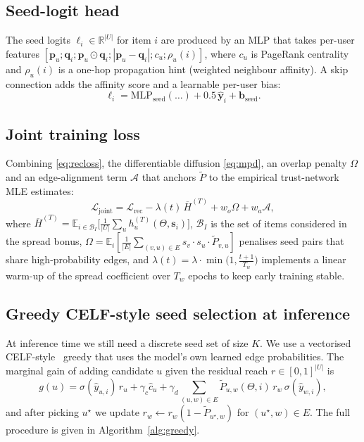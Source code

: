 \documentclass[conference]{IEEEtran}
\begin{document}
\subsection{Seed-logit head}
The seed logits $\boldsymbol{\ell}_i\in\mathbb{R}^{|U|}$ for item $i$
are produced by an MLP that takes per-user features
$[\mathbf{p}_u;\mathbf{q}_i;\mathbf{p}_u\!\odot\!\mathbf{q}_i;
|\mathbf{p}_u-\mathbf{q}_i|;c_u;\rho_u(i)]$, where $c_u$ is PageRank
centrality and $\rho_u(i)$ is a one-hop propagation hint
(weighted neighbour affinity). A skip connection adds the affinity
score and a learnable per-user bias:
\begin{equation}
\boldsymbol{\ell}_i = \mathrm{MLP}_{\text{seed}}(\dots) + 0.5\,\hat{\mathbf{y}}_i + \mathbf{b}_{\text{seed}}.
\label{eq:seedlogits}
\end{equation}

\subsection{Joint training loss}
Combining \eqref{eq:recloss}, the differentiable diffusion
\eqref{eq:mpd}, an overlap penalty $\Omega$ and an edge-alignment
term $\mathcal{A}$ that anchors $\widetilde P$ to the empirical
trust-network MLE estimates:
\begin{equation}
\mathcal{L}_{\text{joint}}
=\mathcal{L}_{\text{rec}}-\lambda(t)\,\overline{H}^{(T)}+w_{o}\Omega+w_{a}\mathcal{A},
\label{eq:totalloss}
\end{equation}
where $\overline{H}^{(T)}=\mathbb{E}_{i\in\mathcal{B}_I}\bigl[\frac{1}{|U|}\sum_u h_u^{(T)}(\Theta,\mathbf{s}_i)\bigr]$,
$\mathcal{B}_I$ is the set of items considered in the spread bonus,
$\Omega=\mathbb{E}_i[\frac{1}{|E|}\sum_{(v,u)\in E}s_v\!\cdot\!s_u\!\cdot\!\widetilde P_{v,u}]$ penalises seed pairs that share
high-probability edges, and $\lambda(t)=\lambda\cdot\min\!\bigl(1,\frac{t+1}{T_w}\bigr)$
implements a linear warm-up of the spread coefficient over $T_w$ epochs
to keep early training stable.

\subsection{Greedy CELF-style seed selection at inference}
At inference time we still need a discrete seed set of size $K$. We use
a vectorised CELF-style~\cite{leskovec2007celf} greedy that uses the
model's own learned edge probabilities. The marginal gain of adding
candidate $u$ given the residual reach $r\in[0,1]^{|U|}$ is
\begin{equation}
g(u)=\sigma(\hat y_{u,i})\,r_u + \gamma_c\widehat{c}_u +
\gamma_d\!\!\!\sum_{(u,w)\in E}\!\!\widetilde P_{u,w}(\Theta,i)\,r_w\,\sigma(\hat y_{w,i}),
\label{eq:greedy}
\end{equation}
and after picking $u^\star$ we update $r_{w}\!\leftarrow\!r_w(1-\widetilde P_{u^\star,w})$
for $(u^\star,w)\in E$. The full procedure is given in
Algorithm~\ref{alg:greedy}.
\end{document}

